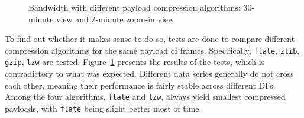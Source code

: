 \documentclass[12pt]{report}
\begin{document}
\begin{figure}[htb]
  \caption{\label{fig:cmp}Bandwidth with different payload compression algorithms: 30-minute view and 2-minute zoom-in view}
\end{figure}

To find out whether it makes sense to do so, tests are done to compare different compression algorithms for the same payload of frames. Specifically, \texttt{flate}, \texttt{zlib}, \texttt{gzip}, \texttt{lzw} are tested. Figure~\ref{fig:cmp} presents the results of the tests, which is contradictory to what was expected. Different data series generally do not cross each other, meaning their performance is fairly stable across different DFs. Among the four algorithms, \texttt{flate} and \texttt{lzw}, always yield smallest compressed payloads, with \texttt{flate} being slight better most of time.
\end{document}

